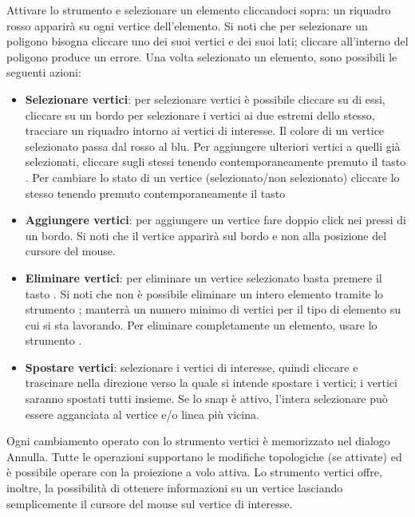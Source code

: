 
Attivare lo strumento  e selezionare un elemento 
cliccandoci sopra: un riquadro rosso apparirà su ogni vertice dell'elemento.
Si noti che per selezionare un poligono bisogna cliccare uno dei suoi vertici e dei suoi lati; 
cliccare all'interno del poligono produce un errore. Una volta selezionato un elemento, sono 
possibili le seguenti azioni: 

\begin{itemize}[label=--]
\item \textbf{Selezionare vertici}: per selezionare vertici è possibile cliccare su di essi, 
cliccare su un bordo per selezionare i vertici ai due estremi dello stesso, tracciare un 
riquadro intorno ai vertici di interesse. Il colore di un vertice selezionato passa dal rosso 
al blu. Per aggiungere ulteriori vertici a quelli già selezionati, cliccare sugli stessi tenendo 
contemporaneamente premuto il tasto . Per cambiare lo stato di un vertice 
(selezionato/non selezionato) cliccare lo stesso tenendo premuto contemporaneamente il tasto 
\item \textbf{Aggiungere vertici}: per aggiungere un vertice fare doppio click nei pressi di un 
bordo. Si noti che il vertice apparirà sul bordo e non alla posizione del cursore del mouse.
\item \textbf{Eliminare vertici}: per eliminare un vertice selezionato basta premere il tasto
. Si noti che non è possibile eliminare un intero elemento tramite lo strumento 
; \qg manterrà un numero minimo di vertici per il 
tipo di elemento su cui si sta lavorando. Per eliminare completamente un elemento, usare lo strumento
.
\item \textbf{Spostare vertici}: selezionare i vertici di interesse, quindi cliccare e trascinare nella
direzione verso la quale si intende spostare i vertici; i vertici saranno spostati tutti insieme. 
Se lo snap è attivo, l'intera selezionare può essere agganciata al vertice e/o linea più vicina.
\end{itemize}

Ogni cambiamento operato con lo strumento vertici è memorizzato nel dialogo Annulla. Tutte le operazioni 
supportano le modifiche topologiche (se attivate) ed è possibile operare con la proiezione a volo attiva.
Lo strumento vertici offre, inoltre, la possibilità di ottenere informazioni su un vertice lasciando semplicemente 
il cursore del mouse sul vertice di interesse.

